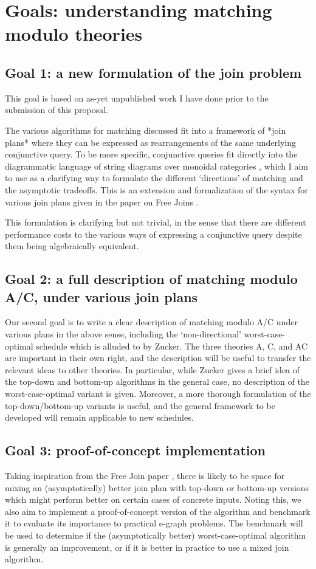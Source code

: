 \documentclass{article}
\begin{document}
\section{Goals: understanding matching modulo theories}
\subsection{Goal 1: a new formulation of the join problem}
This goal is based on as-yet unpublished work I have done prior to the submission of this proposal.

The various algorithms for matching discussed fit into a framework of *join plans* where they can be expressed as rearrangements of the same underlying conjunctive query. To be more specific, conjunctive queries fit directly into the diagrammatic language of string diagrams over monoidal categories \citep{selinger2010survey}, which I aim to use as a clarifying way to formulate the different `directions' of matching and the asymptotic tradeoffs. This is an extension and formalization of the syntax for various join plans given in the paper on Free Joins \cite{wang2023free}.

This formulation is clarifying but not trivial, in the sense that there are different performance costs to the various ways of expressing a conjunctive query despite them being algebraically equivalent.

\subsection{Goal 2: a full description of matching modulo A/C, under various join plans}
Our second goal is to write a clear description of matching modulo A/C under various plans in the above sense, including the `non-directional' worst-case-optimal schedule which is alluded to by Zucker. The three theories A, C, and AC are important in their own right, and the description will be useful to transfer the relevant ideas to other theories. In particular, while Zucker gives a brief idea of the top-down and bottom-up algorithms in the general case, no description of the worst-case-optimal variant is given. Moreover, a more thorough formulation of the top-down/bottom-up variants is useful, and the general framework to be developed will remain applicable to new schedules.

\subsection{Goal 3: proof-of-concept implementation}
Taking inspiration from the Free Join paper \cite{wang2023free}, there is likely to be space for mixing an (asymptotically) better join plan with top-down or bottom-up versions which might perform better on certain cases of concrete inputs. Noting this, we also aim to implement a proof-of-concept version of the algorithm and benchmark it to evaluate its importance to practical e-graph problems. The benchmark will be used to determine if the (asymptotically better) worst-case-optimal algorithm is generally an improvement, or if it is better in practice to use a mixed join algorithm.
\end{document}
